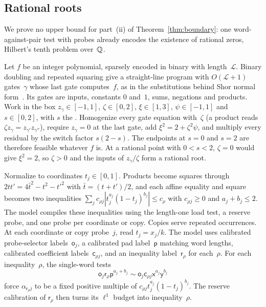 \subsection{Rational roots}\label{sec:rational-roots}

We prove no upper bound for part~(ii) of Theorem~\ref{thm:boundary}: one
word-against-pair test with probes already encodes the existence of
rational zeros, Hilbert's tenth problem over~$\mathbb{Q}$.

Let $f$ be an integer polynomial, sparsely encoded in binary with
length~$\mathcal L$. Binary doubling and repeated squaring give a straight-line
program with $O(\mathcal L+1)$ gates~$\gamma$ whose last gate computes~$f$, as in the
substitutions behind Shor normal form~\cite[Section~3.3, proof of Theorem~1(3)]{bihanrojasstella}.
Its gates are inputs, constants $0$ and~$1$, sums, negations and products.
Work in the box $z_\gamma\in[-1,1]$, $\zeta\in[0,2]$, $\xi\in[1,3]$,
$\psi\in[-1,1]$ and $s\in[0,2]$, with $s$ the . Homogenize every gate equation with~$\zeta$ (a product
reads $\zeta z_\gamma=z_{\gamma'}z_{\gamma''}$), require $z_\gamma=0$ at
the last gate, add $\xi^2=2+\zeta^2\psi$, and multiply every residual by
the switch factor $s(2-s)$. The endpoints at $s=0$ and $s=2$ are
therefore feasible whatever $f$ is. At a rational point with $0<s<2$,
$\zeta=0$ would give $\xi^2=2$, so $\zeta>0$ and the inputs of
$z_\gamma/\zeta$ form a rational root.

Normalize to coordinates $t_j\in[0,1]$. Products become squares through
$2tt'=4\bar t^2-t^2-t'^2$ with $\bar t=(t+t')/2$, and each affine equality
and square becomes two inequalities
$\sum_jc_{\rho j}|t_j^{a_j}(1-t_j)^{b_j}|\le c_\rho$ with $c_{\rho j}\ge0$
and $a_j+b_j\le2$. The model compiles these inequalities using the length-one load test, a
reserve probe, and one probe per coordinate or copy. Copies serve repeated
occurrences. At each coordinate or copy probe~$j$, read $t_j=x_j/k$. The
model uses calibrated probe-selector labels~$\mathsf o_j$, a calibrated
pad label~$\mathsf p$ matching word lengths, calibrated coefficient
labels~$\mathsf c_{\rho j}$, and an inequality label~$\mathsf r_\rho$ for
each~$\rho$. For each inequality~$\rho$, the single-word tests
\[
  \mathsf o_j\mathsf r_\rho\mathsf p^{a_j+b_j}\sim
  \mathsf o_j\mathsf c_{\rho j}\mathsf x^{a_j}\mathsf y^{b_j}
\]
force $\alpha_{\mathsf r_\rho j}$ to be a fixed positive multiple of
$c_{\rho j}t_j^{a_j}(1-t_j)^{b_j}$. The reserve calibration of
$\mathsf r_\rho$ then turns its $\ell^1$ budget into inequality~$\rho$.

